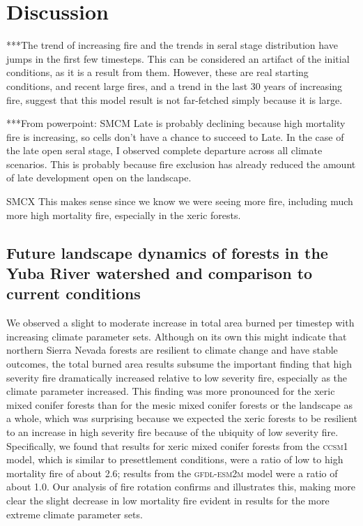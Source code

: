 \section{Discussion}

***The trend of increasing fire and the trends in seral stage distribution have jumps in the first few timesteps. This can be considered an artifact of the initial conditions, as it is a result from them. However, these are real starting conditions, and recent large fires, and a trend in the last 30 years of increasing fire, suggest that this model result is not far-fetched simply because it is large.

***From powerpoint: SMCM Late is probably declining because high mortality fire is increasing, so cells don’t have a chance to succeed to Late. In the case of the late open seral stage, I observed complete departure across all climate scenarios. This is probably because fire exclusion has already reduced the amount of late development open on the landscape.

SMCX This makes sense since we know we were seeing more fire, including much more high mortality fire, especially in the xeric forests.



\subsection{Future landscape dynamics of forests in the Yuba River watershed and comparison to current conditions}
We observed a slight to moderate increase in total area burned per timestep with increasing climate parameter sets. Although on its own this might indicate that northern Sierra Nevada forests are resilient to climate change and have stable outcomes, the total burned area results subsume the important finding that high severity fire dramatically increased relative to low severity fire, especially as the climate parameter increased. This finding was more pronounced for the xeric mixed conifer forests than for the mesic mixed conifer forests or the landscape as a whole, which was surprising because we expected the xeric forests to be resilient to an increase in high severity fire because of the ubiquity of low severity fire. Specifically, we found that results for xeric mixed conifer forests from the \textsc{ccsm1} model, which is similar to presettlement conditions, were a ratio of low to high mortality fire of about 2.6; results from the \textsc{gfdl-esm2m} model were a ratio of about 1.0. Our analysis of fire rotation confirms and illustrates this, making more clear the slight decrease in low mortality fire evident in results for the more extreme climate parameter sets.

